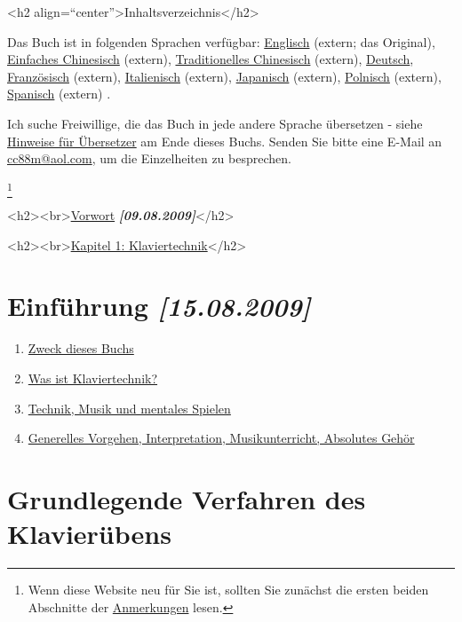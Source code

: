 
\hypertarget{Inhalt}{}

<h2 align=\enquote{center}>Inhaltsverzeichnis</h2>

Das Buch ist in folgenden Sprachen verfügbar:
 \hyperref[http://www.pianopractice.org]{Englisch} (extern; das Original),
 \hyperref[http://bbs.popiano.org/viewthread.php?tid=81448&amp;extra=page\%3D3]{Einfaches Chinesisch} (extern),
 \hyperref[http://www.pianogarden.tw]{Traditionelles Chinesisch} (extern),
 \hyperref[./index.html]{Deutsch},
 \hyperref[http://pagesperso-orange.fr/musico/documents/textes/pianopratique/tabledesmatieres_fr.htm]{Französisch} (extern),
 \hyperref[http://web.tiscali.it/pianobook]{Italienisch} (extern),
 \hyperref[http://pianofundamental.sakura.ne.jp]{Japanisch} (extern),
 \hyperref[http://pianoart.eu.interia.pl]{Polnisch} (extern),
 \hyperref[http://www.pianopractice.org/spanish.pdf]{Spanisch} (extern)
 .

Ich suche Freiwillige, die das Buch in jede andere Sprache übersetzen - siehe \hyperlink{HinUeber}{Hinweise für Übersetzer} am Ende dieses Buchs.
Senden Sie bitte eine E-Mail an \hyperref[mailto:cc88m@aol.com?subject=foppde:\%20Translation\%20request]{cc88m@aol.com}, um die Einzelheiten zu besprechen.

\footnote{Wenn diese Website neu für Sie ist, sollten Sie zunächst die ersten beiden Abschnitte der \hyperlink{anmerkungen}{Anmerkungen} lesen.}


<h2><br>\hyperlink{preface}{Vorwort} \textbf{\textit{[09.08.2009]}}</h2>

<h2><br>\hyperlink{c1i1}{Kapitel 1: Klaviertechnik}</h2>

\chapter{Einführung \textbf{\textit{[15.08.2009]}}}

\begin{enumerate} 
 \item \hyperlink{c1i1}{Zweck dieses Buchs}
 \item \hyperlink{c1i2}{Was ist Klaviertechnik?}
 \item \hyperlink{c1i3}{Technik, Musik und mentales Spielen}
 \item \hyperlink{c1i4}{Generelles Vorgehen, Interpretation, Musikunterricht, Absolutes Gehör}
 \end{enumerate}

\chapter{Grundlegende Verfahren des Klavierübens}

